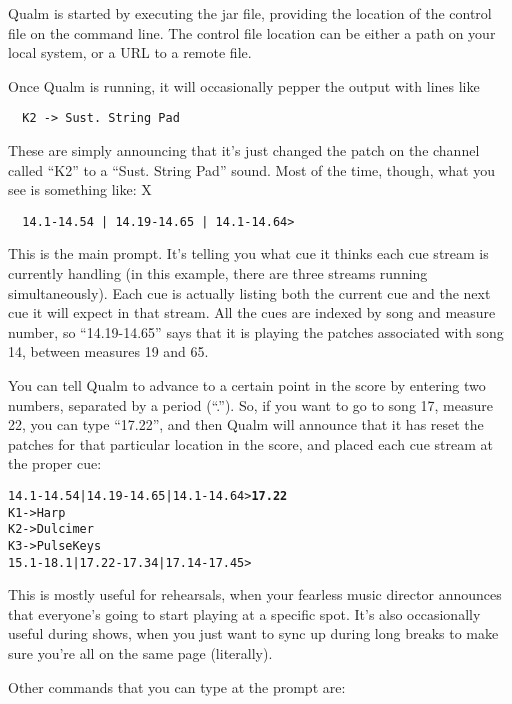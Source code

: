\documentclass{article}
\newcommand{\q}{{\textsf{Qualm}}\xspace}
\begin{document}
\q is started by executing the jar file, providing the location of the
control file on the command line.  The control file location can be
either a path on your local system, or a URL to a remote file.

Once \q is running, it will occasionally pepper the output with lines
like

\begin{verbatim}
  K2 -> Sust. String Pad
\end{verbatim}

These are simply announcing that it's just changed the patch on the
channel called ``K2'' to a ``Sust. String Pad'' sound.  Most of the time,
though, what you see is something like:
X
\begin{verbatim}
  14.1-14.54 | 14.19-14.65 | 14.1-14.64>
\end{verbatim}

This is the main prompt.  It's telling you what cue it thinks each cue
stream is currently handling (in this example, there are three
streams running simultaneously).  Each cue is actually listing both
the current cue and the next cue it will expect in that stream.  All
the cues are indexed by song and measure number, so ``14.19-14.65''
says that it is playing the patches associated with song 14, between
measures 19 and 65.

You can tell \q to advance to a certain point in the score by
entering two numbers, separated by a period (``.'').  So, if you want to
go to song 17, measure 22, you can type ``17.22'', and then \q will
announce that it has reset the patches for that particular location in
the score, and placed each cue stream at the proper cue:


\begin{alltt}
    14.1-14.54 | 14.19-14.65 | 14.1-14.64> \textbf{17.22}
    K1 -> Harp
    K2 -> Dulcimer
    K3 -> Pulse Keys
    15.1-18.1 | 17.22-17.34 | 17.14-17.45>
\end{alltt}

This is mostly useful for rehearsals, when your fearless music
director announces that everyone's going to start playing at a specific
spot.  It's also occasionally useful during shows, when you just want
to sync up during long breaks to make sure you're all on the same page
(literally).

Other commands that you can type at the prompt are:
\end{document}
